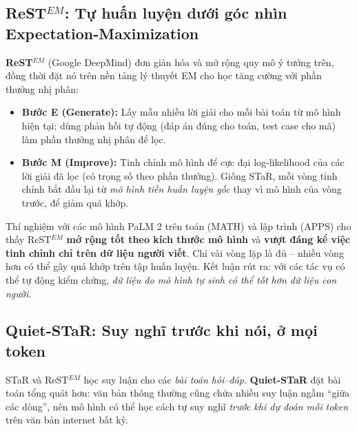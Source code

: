 \subsection{ReST\texorpdfstring{$^{EM}$}{-EM}: Tự huấn luyện dưới góc nhìn Expectation-Maximization}
\label{ssec:restem}
\textbf{ReST$^{EM}$} \cite{singh2024restem} (Google DeepMind) đơn giản hóa và mở rộng quy mô ý tưởng trên, đồng thời đặt nó trên nền tảng lý thuyết EM cho học tăng cường với phần thưởng nhị phân:
\begin{itemize}
	\item \textbf{Bước E (Generate):} Lấy mẫu nhiều lời giải cho mỗi bài toán từ mô hình hiện tại; dùng phản hồi tự động (đáp án đúng cho toán, test case cho mã) làm phần thưởng nhị phân để lọc.
	\item \textbf{Bước M (Improve):} Tinh chỉnh mô hình để cực đại log-likelihood của các lời giải đã lọc (có trọng số theo phần thưởng). Giống STaR, mỗi vòng tinh chỉnh bắt đầu lại từ \emph{mô hình tiền huấn luyện gốc} thay vì mô hình của vòng trước, để giảm quá khớp.
\end{itemize}
Thí nghiệm với các mô hình PaLM 2 trên toán (MATH) và lập trình (APPS) cho thấy ReST$^{EM}$ \textbf{mở rộng tốt theo kích thước mô hình} và \textbf{vượt đáng kể việc tinh chỉnh chỉ trên dữ liệu người viết}. Chỉ vài vòng lặp là đủ -- nhiều vòng hơn có thể gây quá khớp trên tập huấn luyện. Kết luận rút ra: với các tác vụ có thể tự động kiểm chứng, \emph{dữ liệu do mô hình tự sinh có thể tốt hơn dữ liệu con người}.

\subsection{Quiet-STaR: Suy nghĩ trước khi nói, ở mọi token}
\label{ssec:quiet_star}
STaR và ReST$^{EM}$ học suy luận cho các \emph{bài toán hỏi--đáp}. \textbf{Quiet-STaR} \cite{zelikman2024quietstar} đặt bài toán tổng quát hơn: văn bản thông thường cũng chứa nhiều suy luận ngầm “giữa các dòng”, nên mô hình có thể học cách tự suy nghĩ \emph{trước khi dự đoán mỗi token} trên văn bản internet bất kỳ.


